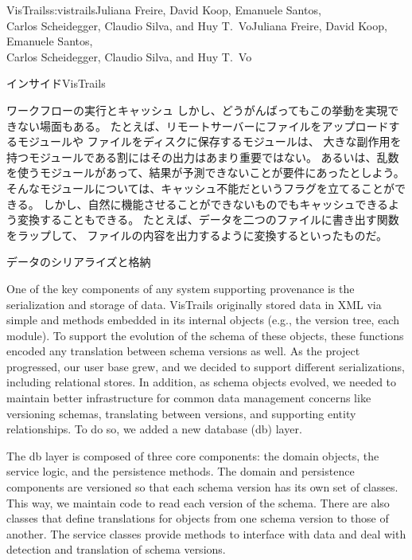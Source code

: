 \begin{aosachaptertoc}{VisTrails}{s:vistrails}{Juliana Freire, David Koop, Emanuele Santos, \\ Carlos Scheidegger, Claudio Silva, and Huy T.\ Vo}{Juliana Freire, David Koop, Emanuele Santos, \\ \hspace*{0.9cm} Carlos Scheidegger, Claudio Silva, and Huy T.\ Vo}
\begin{aosasect1}{インサイドVisTrails}
\begin{aosasect2}{ワークフローの実行とキャッシュ}
しかし、どうがんばってもこの挙動を実現できない場面もある。
たとえば、リモートサーバーにファイルをアップロードするモジュールや
ファイルをディスクに保存するモジュールは、
大きな副作用を持つモジュールである割にはその出力はあまり重要ではない。
あるいは、乱数を使うモジュールがあって、結果が予測できないことが要件にあったとしよう。
そんなモジュールについては、キャッシュ不能だというフラグを立てることができる。
しかし、自然に機能させることができないものでもキャッシュできるよう変換することもできる。
たとえば、データを二つのファイルに書き出す関数をラップして、
ファイルの内容を出力するように変換するといったものだ。

\end{aosasect2}

\begin{aosasect2}{データのシリアライズと格納}

One of the key components of any system supporting provenance is the
serialization and storage of data.  VisTrails originally stored data
in XML via simple  and  methods embedded in
its internal objects (e.g., the version tree, each module).  To
support the evolution of the schema of these objects, these functions
encoded any translation between schema versions as well.  As the
project progressed, our user base grew, and we decided to support
different serializations, including relational stores.  In
addition, as schema objects evolved, we needed to maintain better
infrastructure for common data management concerns like versioning
schemas, translating between versions, and supporting entity
relationships.  To do so, we added a new database (db) layer.

The db layer is composed of three core components: the domain objects,
the service logic, and the persistence methods.  The domain and
persistence components are versioned so that each schema version has
its own set of classes.  This way, we maintain code to read each
version of the schema.  There are also classes that define
translations for objects from one schema version to those of another.
The service classes provide methods to interface with data and deal
with detection and translation of schema versions.


\end{aosasect2}
\end{aosasect1}
\end{aosachaptertoc}
